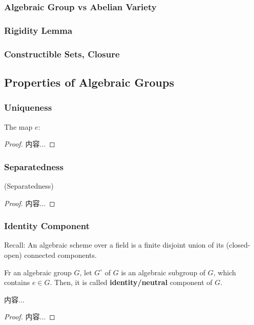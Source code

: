 \documentclass[Total.tex]{subfiles}
\begin{document}
\begin{example}
\begin{gather*rbracketlength=[0.15]}
			\subsubsection{Algebraic Group vs Abelian Variety}
			\subsubsection{Rigidity Lemma}
			\subsubsection{Constructible Sets, Closure}
		\subsection{Properties of Algebraic Groups}
			\subsubsection{Uniqueness}
				\begin{proposition}
				The map $e:$
			\end{proposition}
			\begin{proof}
				内容...
			\end{proof}
			\subsubsection{Separatedness}
			\begin{proposition}
				(Separatedness) 
			\end{proposition}
			\begin{proof}
				内容...
			\end{proof}
			\subsubsection{Identity Component}
			Recall: An algebraic scheme over a field is a finite disjoint union of its (closed-open)
			connected components.
			\begin{Def}
				Fr an algebraic group $G$, let $G^\circ$ of $G$ is an algebraic subgroup of $G$, which contains $e\in G$. Then, it is called \textbf{identity/neutral} component of $G$.
			\end{Def} 
			\begin{proposition}
				内容...
			\end{proposition}
			\begin{proof}
				内容...
			\end{proof}

\end{gather*rbracketlength=[0.15]}
\end{example}
\end{document}
